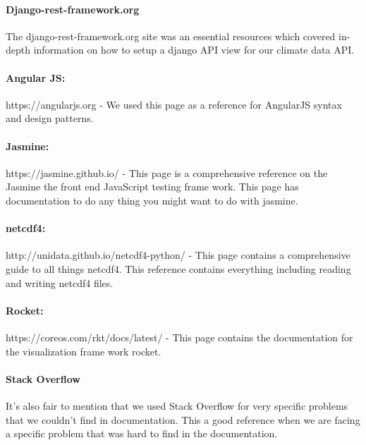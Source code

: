 \documentclass[onecolumn, draftclsnofoot,10pt, compsoc]{article}
\begin{document}
            \paragraph{Django-rest-framework.org} The django-rest-framework.org site was an essential resources which covered in-depth information on how to setup a django API view for our climate data API.\\
            
            \paragraph{Angular JS: } https://angularjs.org - We used this page as a reference for AngularJS syntax and design patterns.\\
            
            \paragraph{Jasmine: } https://jasmine.github.io/ - This page is a comprehensive reference on the Jasmine the front end JavaScript testing frame work. This page has documentation to do any thing you might want to do with jasmine.\\ 
            
            \paragraph{netcdf4: } http://unidata.github.io/netcdf4-python/ - This page contains a comprehensive guide to all things netcdf4. This reference contains everything including reading and writing netcdf4 files.\\
            
            \paragraph{Rocket: } https://coreos.com/rkt/docs/latest/ - This page contains the documentation for the visualization frame work rocket.\\
            
            \paragraph{Stack Overflow} It's also fair to mention that we used Stack Overflow for very specific problems that we couldn't find in documentation. This a good reference when we are facing a specific problem that was hard to find in the documentation.\\
\end{document}
